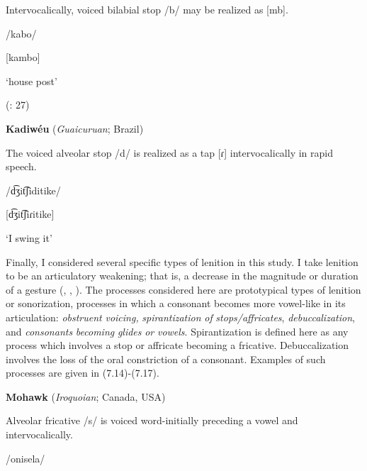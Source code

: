 Intervocalically, voiced bilabial stop /b/ may be realized as [mb].



/kabo/



[kambo]



‘house post’



(\citealt{KotapishKotapish1973}: 27)
\z



\ea\label{ex:(7.13)}
  \textbf{Kadiwéu} (\textit{Guaicuruan}; Brazil)



The voiced alveolar stop /d/ is realized as a tap [ɾ] intervocalically in rapid speech.



/d͡ʒit͡ʃiditike/



[d͡ʒit͡ʃiɾitike]



‘I swing it’



\citep[16]{Sandalo1997}

\z


  Finally, I considered several specific types of lenition in this study. I take lenition to be an articulatory weakening; that is, a decrease in the magnitude or duration of a gesture (\citealt{BrowmanGoldstein1992b}, \citealt{MowreyPagliuca1995}, \citealt{BybeeEasterday2019}). The processes considered here are prototypical types of lenition or sonorization, processes in which a consonant becomes more vowel-like in its articulation: \textit{obstruent} \textit{voicing,} \textit{spirantization} \textit{of} \textit{stops/affricates}, \textit{debuccalization}, and \textit{consonants} \textit{becoming} \textit{glides} \textit{or} \textit{vowels}. Spirantization is defined here as any process which involves a stop or affricate becoming a fricative. Debuccalization involves the loss of the oral constriction of a consonant. Examples of such processes are given in (7.14)-(7.17).



\ea\label{ex:(7.14)}
  \textbf{Mohawk} (\textit{Iroquoian}; Canada, USA)



Alveolar fricative /s/ is voiced word-initially preceding a vowel and intervocalically.



/onisela/



